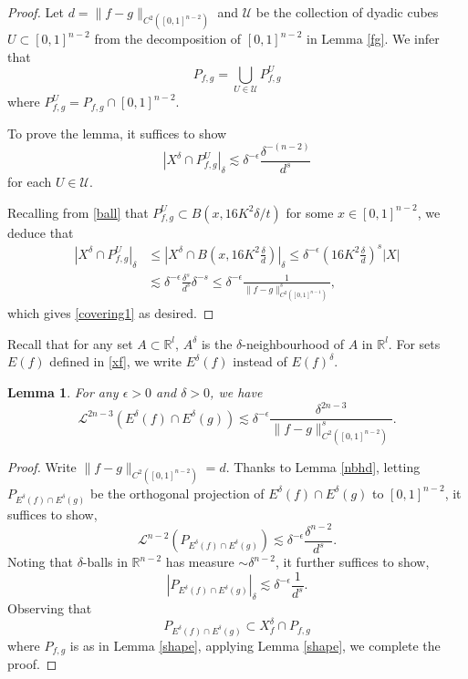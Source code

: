 \documentclass[11pt,a4paper,reqno]{amsart}
\newcommand{\R}{\mathbb{R}}
\newcommand{\calU}{\mathcal{U}}
\newcommand{\1}{\mathbf{1}}
\numberwithin{equation}{section}
\theoremstyle{plain}
\newtheorem{lemma}[equation]{Lemma}
\theoremstyle{definition}
\theoremstyle{remark}
\begin{document}
\begin{proof}
  Let $d=\|f-g\|_{C^2([0,1]^{n-2})}$ and
  $\calU$ be the collection of dyadic cubes $U \subset [0,1]^{n-2}$ from the decomposition of $[0,1]^{n-2}$ in Lemma \ref{fg}. We infer that
  $$  P_{f,g} = \bigcup_{U \in \calU} P_{f,g}^U $$
  where $P_{f,g}^U = P_{f,g} \cap [0,1]^{n-2}$.

  To prove the lemma, it suffices to show
  \begin{equation}\label{covering1}
    |X^\delta \cap P_{f,g}^U|_\delta \lesssim \delta^{-\epsilon} \frac{\delta^{-(n-2)}}{{d}^s}
  \end{equation}
  for each $U \in \calU$.

  Recalling from \eqref{ball} that $P_{f,g}^U \subset  B(x,16K^2\delta/t)$ for some $x \in [0,1]^{n-2}$, we deduce that
  \begin{align*}
  |X^\delta \cap P_{f,g}^U|_\delta & \le  |X^\delta \cap B(x, 16K^2\frac{\delta}{ d })|_\delta \le \delta^{-\epsilon}( 16K^2\frac{\delta}{ d })^{s} |X|  \\
   & \lesssim \delta^{-\epsilon} \frac{\delta^s}{d^s}\delta^{-s} \le \delta^{-\epsilon} \frac{1}{\|f-g\|_{C^2([0,1]^{n-1})}^s},
\end{align*}
which gives \eqref{covering1} as desired.
\end{proof}

Recall that for any set $A \subset \R^l$, $A^\delta$ is the $\delta$-neighbourhood of $A$ in $\R^{l}$. For sets $E(f)$ defined in \eqref{xf}, we write $E^\delta(f)$ instead of $E(f)^\delta$.

\begin{lemma} \label{enbhd} For any $\epsilon>0$ and $\delta >0$, we have
  \begin{equation}\label{3ez}
    \mathcal{L}^{2n-3}(E^\delta(f) \cap E^\delta(g)) \lesssim \delta^{-\epsilon} \frac{\delta^{2n-3}}{\|f-g\|_{C^2([0,1]^{n-2})}^s}.
  \end{equation}
\end{lemma}


\begin{proof}
Write $\|f-g\|_{C^2([0,1]^{n-2})} = d$. Thanks to Lemma \ref{nbhd}, letting $P_{E^\delta(f) \cap E^\delta(g)}$ be the orthogonal projection of $E^\delta(f) \cap E^\delta(g)$ to $[0,1]^{n-2}$,
it suffices to show,
\begin{equation}
    \mathcal{L}^{n-2}(P_{E^\delta(f) \cap E^\delta(g)}) \lesssim \delta^{-\epsilon} \frac{\delta^{n-2}}{d^s}.
  \end{equation}
Noting that $\delta$-balls in $\mathbb{R}^{n-2}$ has measure $\sim \delta^{n-2}$, it further suffices to show,
   $$ |P_{E^\delta(f) \cap E^\delta(g)}|_{\delta} \lesssim \delta^{-\epsilon} \frac{1}{d^s}. $$
   Observing that
   $$P_{E^\delta(f) \cap E^\delta(g)} \subset X_f^\delta \cap P_{f,g} $$
   where $P_{f,g}$ is as in Lemma \ref{shape},
   applying Lemma \ref{shape}, we complete the proof.
\end{proof}
\end{document}
